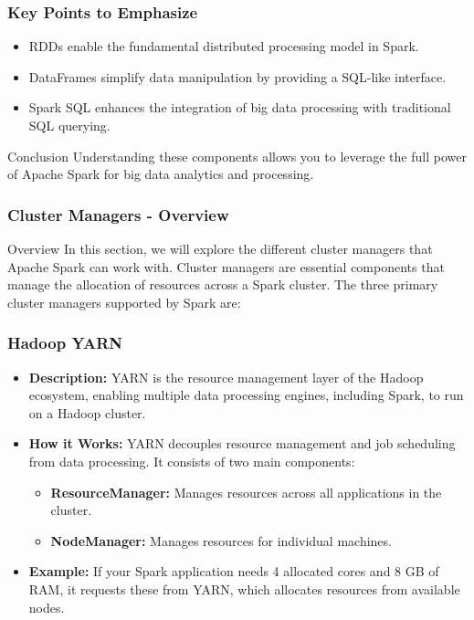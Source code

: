 \documentclass[aspectratio=169]{beamer}
\begin{document}
\begin{frame}
    \frametitle{Key Points to Emphasize}
    \begin{itemize}
        \item RDDs enable the fundamental distributed processing model in Spark.
        \item DataFrames simplify data manipulation by providing a SQL-like interface.
        \item Spark SQL enhances the integration of big data processing with traditional SQL querying.
    \end{itemize}
    \begin{block}{Conclusion}
        Understanding these components allows you to leverage the full power of Apache Spark for big data analytics and processing.
    \end{block}
\end{frame}

\begin{frame}[fragile]
    \frametitle{Cluster Managers - Overview}
    \begin{block}{Overview}
        In this section, we will explore the different cluster managers that Apache Spark can work with. 
        Cluster managers are essential components that manage the allocation of resources across a Spark cluster. 
        The three primary cluster managers supported by Spark are:
    \end{block}
\end{frame}

\begin{frame}[fragile]
    \frametitle{Hadoop YARN}
    \begin{itemize}
        \item \textbf{Description:} YARN is the resource management layer of the Hadoop ecosystem, enabling multiple data processing engines, including Spark, to run on a Hadoop cluster.
        
        \item \textbf{How it Works:} YARN decouples resource management and job scheduling from data processing. It consists of two main components:
        \begin{itemize}
            \item \textbf{ResourceManager:} Manages resources across all applications in the cluster.
            \item \textbf{NodeManager:} Manages resources for individual machines.
        \end{itemize}
        
        \item \textbf{Example:} If your Spark application needs 4 allocated cores and 8 GB of RAM, it requests these from YARN, which allocates resources from available nodes.
    \end{itemize}
\end{frame}
\end{document}
